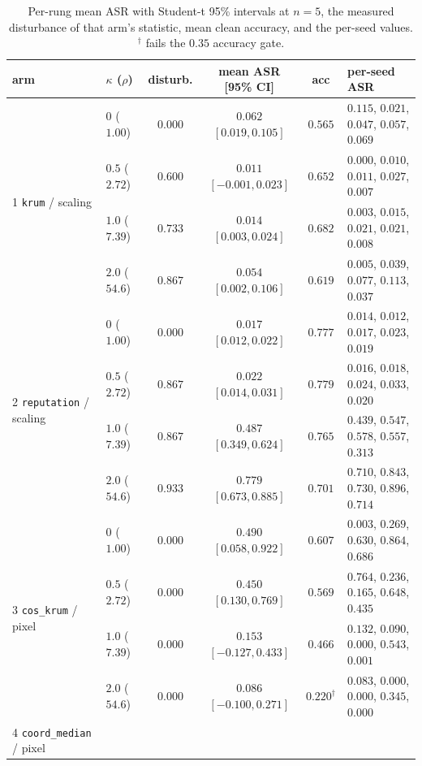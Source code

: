 \documentclass{article}
\begin{document}
\begin{table}[h]
\caption{Per-rung mean ASR with Student-t 95\% intervals at $n{=}5$, the measured disturbance of that arm's statistic, mean clean accuracy, and the per-seed values. $^{\dagger}$ fails the $0.35$ accuracy gate.}
\label{tab:dose_perseed}
\centering\scriptsize
\begin{tabular}{llcccl}
\toprule
\textbf{arm} & $\kappa$ ($\rho$) & \textbf{disturb.} & \textbf{mean ASR [95\% CI]} & \textbf{acc} & \textbf{per-seed ASR} \\
\midrule
\multirow{4}{*}{1 \texttt{krum} / scaling}
 & $0$ ($1.00$) & $0.000$ & $0.062$ $[0.019, 0.105]$ & $0.565$ & $0.115$, $0.021$, $0.047$, $0.057$, $0.069$ \\
 & $0.5$ ($2.72$) & $0.600$ & $0.011$ $[-0.001, 0.023]$ & $0.652$ & $0.000$, $0.010$, $0.011$, $0.027$, $0.007$ \\
 & $1.0$ ($7.39$) & $0.733$ & $0.014$ $[0.003, 0.024]$ & $0.682$ & $0.003$, $0.015$, $0.021$, $0.021$, $0.008$ \\
 & $2.0$ ($54.6$) & $0.867$ & $0.054$ $[0.002, 0.106]$ & $0.619$ & $0.005$, $0.039$, $0.077$, $0.113$, $0.037$ \\
\midrule
\multirow{4}{*}{2 \texttt{reputation} / scaling}
 & $0$ ($1.00$) & $0.000$ & $0.017$ $[0.012, 0.022]$ & $0.777$ & $0.014$, $0.012$, $0.017$, $0.023$, $0.019$ \\
 & $0.5$ ($2.72$) & $0.867$ & $0.022$ $[0.014, 0.031]$ & $0.779$ & $0.016$, $0.018$, $0.024$, $0.033$, $0.020$ \\
 & $1.0$ ($7.39$) & $0.867$ & $0.487$ $[0.349, 0.624]$ & $0.765$ & $0.439$, $0.547$, $0.578$, $0.557$, $0.313$ \\
 & $2.0$ ($54.6$) & $0.933$ & $0.779$ $[0.673, 0.885]$ & $0.701$ & $0.710$, $0.843$, $0.730$, $0.896$, $0.714$ \\
\midrule
\multirow{4}{*}{3 \texttt{cos\_krum} / pixel}
 & $0$ ($1.00$) & $0.000$ & $0.490$ $[0.058, 0.922]$ & $0.607$ & $0.003$, $0.269$, $0.630$, $0.864$, $0.686$ \\
 & $0.5$ ($2.72$) & $0.000$ & $0.450$ $[0.130, 0.769]$ & $0.569$ & $0.764$, $0.236$, $0.165$, $0.648$, $0.435$ \\
 & $1.0$ ($7.39$) & $0.000$ & $0.153$ $[-0.127, 0.433]$ & $0.466$ & $0.132$, $0.090$, $0.000$, $0.543$, $0.001$ \\
 & $2.0$ ($54.6$) & $0.000$ & $0.086$ $[-0.100, 0.271]$ & $0.220^{\dagger}$ & $0.083$, $0.000$, $0.000$, $0.345$, $0.000$ \\
\midrule
\multirow{4}{*}{4 \texttt{coord\_median} / pixel}

\end{tabular}
\end{table}
\end{document}
